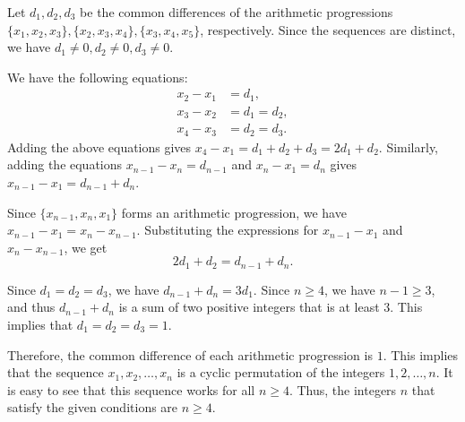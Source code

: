 Let $d_1, d_2, d_3$ be the common differences of the arithmetic progressions $\{x_1, x_2, x_3\}, \{x_2, x_3, x_4\}, \{x_3, x_4, x_5\}$, respectively. Since the sequences are distinct, we have $d_1 \neq 0, d_2 \neq 0, d_3 \neq 0$. 

We have the following equations:
\begin{align*}
x_2 - x_1 &= d_1, \\
x_3 - x_2 &= d_1 = d_2, \\
x_4 - x_3 &= d_2 = d_3.
\end{align*}
Adding the above equations gives $x_4 - x_1 = d_1 + d_2 + d_3 = 2d_1 + d_2$. Similarly, adding the equations $x_{n-1} - x_n = d_{n-1}$ and $x_n - x_1 = d_n$ gives $x_{n-1} - x_1 = d_{n-1} + d_n$.

Since $\{x_{n-1}, x_n, x_1\}$ forms an arithmetic progression, we have $x_{n-1} - x_1 = x_n - x_{n-1}$. Substituting the expressions for $x_{n-1} - x_1$ and $x_n - x_{n-1}$, we get
$$2d_1 + d_2 = d_{n-1} + d_n.$$

Since $d_1 = d_2 = d_3$, we have $d_{n-1} + d_n = 3d_1$. Since $n \geq 4$, we have $n-1 \geq 3$, and thus $d_{n-1} + d_n$ is a sum of two positive integers that is at least $3$. This implies that $d_1 = d_2 = d_3 = 1$.

Therefore, the common difference of each arithmetic progression is $1$. This implies that the sequence $x_1, x_2, \ldots, x_n$ is a cyclic permutation of the integers $1, 2, \ldots, n$. It is easy to see that this sequence works for all $n \geq 4$. Thus, the integers $n$ that satisfy the given conditions are $n \geq 4$.
